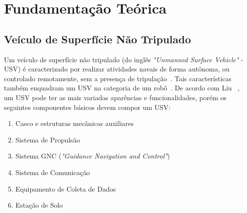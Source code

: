 


\chapter{Fundamentação Teórica}\label{chap2:fund_teo}
    \section{Veículo de Superfície Não Tripulado}\label{subchap2:USV}
        Um veículo de superfície não tripulado (do inglês \textit{"Unmanned Surface Vehicle"} - USV) é caracterizado por realizar atividades navais de forma autônoma, ou controlado remotamente, sem a presença de tripulação~\cite{LIU201671}. Tais características também enquadram um USV na categoria de um robô~\cite{JURAK2020}.
        De acordo com Liu \etal~\cite{LIU201671}, um USV pode ter as mais variadas aparências e funcionalidades, porém os seguintes componentes básicos devem compor um USV:
        
        \begin{enumerate}
            \item Casco e estruturas mecânicas auxiliares
            \item Sistema de Propulsão
            \item Sistema GNC (\textit{"Guidance Navigation and Control"})
            \item Sistema de Comunicação
            \item Equipamento de Coleta de Dados
            \item Estação de Solo
        \end{enumerate}
        
